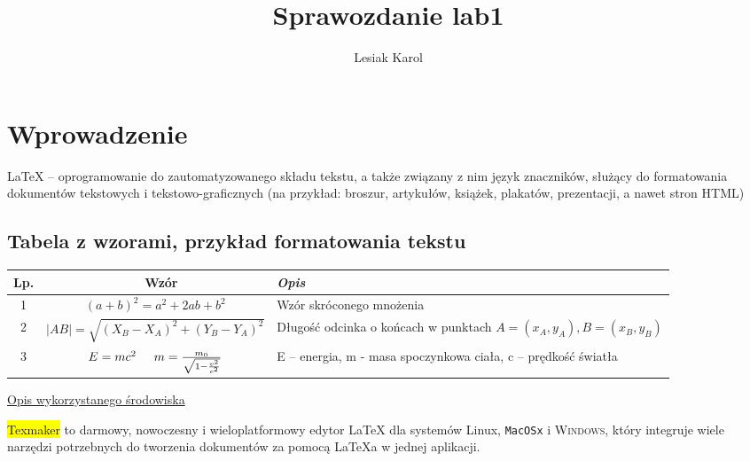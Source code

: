 \documentclass{article}
\begin{document}
\title{Sprawozdanie lab1}
\author{Lesiak Karol}
\maketitle

\section{Wprowadzenie}

LaTeX – oprogramowanie do zautomatyzowanego składu tekstu, a także związany z nim język znaczników, służący do formatowania dokumentów tekstowych i tekstowo-graficznych (na przykład: broszur, artykułów, książek, plakatów, prezentacji, a nawet stron HTML)


\subsection{Tabela z wzorami, przykład formatowania tekstu}
\begin{tabular}{|c|c|p{6.5cm}|}
\hline
Lp. & \ \color{red} \textbf{Wzór} & \color{blue} \textit{Opis} \\ 
\hline
1 & $(a+b)^{2}=a^{2}+2ab+b^{2}$ & Wzór skróconego mnożenia \\
\hline
2 & $|AB|=\sqrt{(X_B - X_A)^2 + (Y_B - Y_A)^2}$ & Długość odcinka o końcach w punktach    \newline   $A=(x_A,y_A), B=(x_B,y_B)$\\
\hline
3 & $ E = mc^2  \hspace{0.5cm}   m = \frac{m_0}{\sqrt{1-\frac{v^2}{c^2}}}$  & E – energia, m - masa spoczynkowa ciała, c – prędkość światła \\
\hline
\end{tabular}

\bigskip
\underline{Opis wykorzystanego środowiska}
\bigskip


\colorbox{yellow}{Texmaker} to {\small{darmowy}}, {\large{nowoczesny}} i {\Large{wieloplatformowy}} {\LARGE{edytor}} {\huge{LaTeX}} dla systemów {\textrm{Linux}}, {\texttt{MacOSx}} i {\textsc{Windows}}, który integruje wiele narzędzi potrzebnych do tworzenia dokumentów za pomocą LaTeXa w jednej aplikacji.
\newline
\newline

\newline
\newline

\medskip
\end{document}
